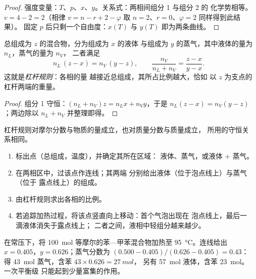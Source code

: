 \begin{proof}
强度变量：$T$、$p$、$x$、$y$。关系式：两相间组分 1 与组分 2 的
化学势相等。$v = 4 - 2 = 2$（相律
$v = n - r + 2 - \varphi$ 取 $n = 2$、$r = 0$、$\varphi = 2$ 同样得到此结果）。
固定 $p$ 后只剩一个自由度：$x(T)$ 与 $y(T)$ 即为两条曲线。
\end{proof}

\begin{theorem}[杠杆规则]\label{thm:b2:liquid-vapour-diagrams:lever}
总组成为 $z$ 的混合物，分为组成为 $x$ 的液体
与组成为 $y$ 的蒸气，其中液体的量为 $n_L$，蒸气的量为 $n_V$，
二者满足
\[
  n_L\,(z - x) = n_V\,(y - z), \qquad \frac{n_V}{n_L + n_V} = \frac{z - x}{y - x} .
\]
这就是\emph{杠杆规则}：各相的量
越接近总组成，其所占比例越大，恰如
以 $z$ 为支点的杠杆两端的重量。
\end{theorem}

\begin{proof}
组分 1 守恒：$(n_L + n_V)z = n_Lx + n_Vy$，于是 $n_L(z - x) =
n_V(y - z)$；两边除以 $n_L + n_V$ 并整理即得。
\end{proof}

杠杆规则对摩尔分数与物质的量成立，也对质量分数与质量成立，
所用的守恒关系相同。

\begin{method}[读取二元相图]\label{met:b2:liquid-vapour-diagrams:read-diagram}
\begin{enumerate}
  \item 标出点（总组成，温度），并确定其所在区域：
        液体、蒸气，或液体 + 蒸气。
  \item 在两相区中，过该点作连线；其两端
        分别给出液体（位于泡点线上）与蒸气（位于
        露点线上）的组成。
  \item 由杠杆规则求出各相的比例。
  \item 若追踪加热过程，将该点竖直向上移动：首个气泡出现在
        泡点线上，最后一滴液体消失于露点线上；
        二者之间，液相中轻组分越来越少。
\end{enumerate}
\end{method}

\begin{example}\label{ex:b2:liquid-vapour-diagrams:flash}
在常压下，将 \qty{100}{mol} 等摩尔的苯—甲苯混合物加热至
\qty{95}{\degreeCelsius}。连线给出 $x =
0.405$，$y = 0.626$；蒸气分数为 $(0.500 - 0.405)/(0.626 - 0.405) =
0.43$：得 \qty{43}{mol} 蒸气，含苯 $43 \times 0.626 = \qty{27}{mol}$，
另有 \qty{57}{mol} 液体，含苯 \qty{23}{mol}。一次平衡级
只能起到少量富集的作用。
\end{example}

